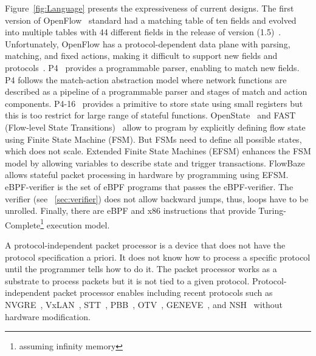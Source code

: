 Figure~\ref{fig:Language} presents the expressiveness of current designs. The first version of OpenFlow~\cite{McKeown:2008:OpenFlow} standard had a matching table of ten fields and evolved into multiple tables with 44 different fields in the release of version (1.5)~\cite{ChristianSurveySDN2015}. Unfortunately, OpenFlow has a protocol-dependent data plane with parsing, matching, and fixed actions, making it difficult to support new fields and 
protocols~\cite{Jouet:2017:BPFabric}.
P4~\cite{Bosshart:2014:P4} provides a programmable parser, enabling to match new fields. P4 follows the match-action abstraction model where network functions are described as a pipeline of a programmable parser and stages of match and action components. P4-16~\cite{P4-16} provides a primitive to store state using small registers but this is too restrict for large range of stateful functions. OpenState~\cite{Bianchi:2014:OPP:2602204.2602211} and FAST (Flow-level State Transitions)~\cite{Moshref:2014:FST:2620728.2620729} allow to program by explicitly defining flow state using Finite State Machine (FSM). But FSMs need to define all possible states, which does not scale. Extended Finite State Machines (EFSM) enhances the FSM model by allowing variables to describe state and trigger transactions. FlowBaze~\cite{FlowBlaze2019} allows stateful packet processing in hardware by programming using EFSM. eBPF-verifier is the set of eBPF programs that passes the eBPF-verifier. The verifier (see \textsection~\ref{sec:verifier}) does not allow backward jumps, thus, loops have to be unrolled. Finally, there are eBPF and x86 instructions that provide Turing-Complete\footnote{assuming infinity memory} execution model.

A protocol-independent packet processor is a device that does not have the protocol specification a priori. It does not know how to process a specific protocol until the programmer tells how to do it. The packet processor works as a substrate to process packets but it is not tied to a given protocol. Protocol-independent packet processor enables including recent protocols such as NVGRE~\cite{rfc7637}, VxLAN~\cite{mahalingam2013}, STT~\cite{davie2014stt}, PBB~\cite{kishjac-bmwg-evpntest-08}, OTV~\cite{hasmit-otv-04}, GENEVE~\cite{ietf-nvo3-geneve-05}, and NSH~\cite{rfc8300} without hardware modification.

